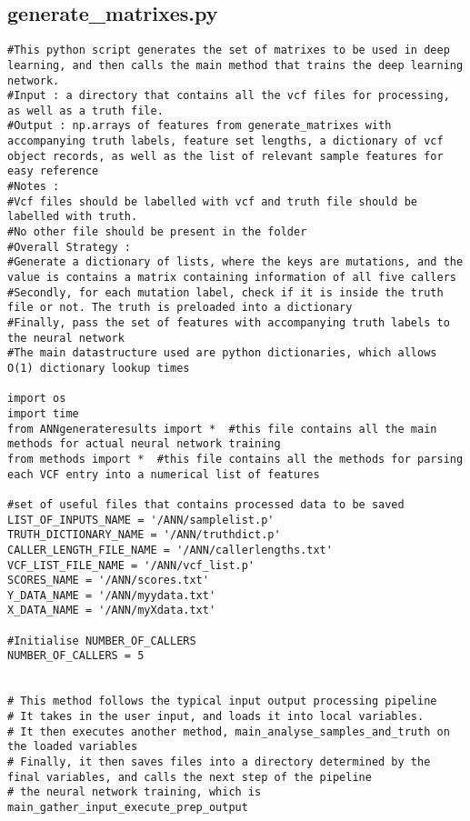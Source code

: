 \documentclass{article}
\begin{document}
\subsection{generate\_matrixes.py}
\begin{verbatim}
#This python script generates the set of matrixes to be used in deep learning, and then calls the main method that trains the deep learning network.
#Input : a directory that contains all the vcf files for processing, as well as a truth file. 
#Output : np.arrays of features from generate_matrixes with accompanying truth labels, feature set lengths, a dictionary of vcf object records, as well as the list of relevant sample features for easy reference
#Notes :
#Vcf files should be labelled with vcf and truth file should be labelled with truth.
#No other file should be present in the folder
#Overall Strategy :
#Generate a dictionary of lists, where the keys are mutations, and the value is contains a matrix containing information of all five callers
#Secondly, for each mutation label, check if it is inside the truth file or not. The truth is preloaded into a dictionary
#Finally, pass the set of features with accompanying truth labels to the neural network 
#The main datastructure used are python dictionaries, which allows O(1) dictionary lookup times 

import os  
import time
from ANNgenerateresults import *  #this file contains all the main methods for actual neural network training
from methods import *  #this file contains all the methods for parsing each VCF entry into a numerical list of features

#set of useful files that contains processed data to be saved
LIST_OF_INPUTS_NAME = '/ANN/samplelist.p'     
TRUTH_DICTIONARY_NAME = '/ANN/truthdict.p'
CALLER_LENGTH_FILE_NAME = '/ANN/callerlengths.txt'
VCF_LIST_FILE_NAME = '/ANN/vcf_list.p'
SCORES_NAME = '/ANN/scores.txt'
Y_DATA_NAME = '/ANN/myydata.txt'
X_DATA_NAME = '/ANN/myXdata.txt'

#Initialise NUMBER_OF_CALLERS
NUMBER_OF_CALLERS = 5


# This method follows the typical input output processing pipeline 
# It takes in the user input, and loads it into local variables. 
# It then executes another method, main_analyse_samples_and_truth on the loaded variables
# Finally, it then saves files into a directory determined by the final variables, and calls the next step of the pipeline
# the neural network training, which is main_gather_input_execute_prep_output


\end{verbatim}
\end{document}
